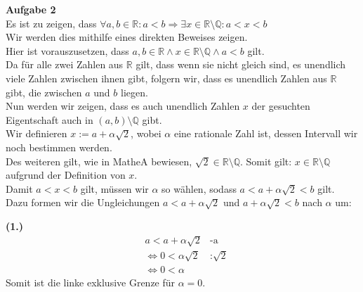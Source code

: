 \documentclass[12pt, a4paper]{article}
\begin{document}
\textbf{Aufgabe 2} \\
Es ist zu zeigen, dass $\forall a,b \in \mathbb R: a < b \Rightarrow \exists x \in \mathbb R \setminus \mathbb Q : a < x < b$\\
Wir werden dies mithilfe eines direkten Beweises zeigen. \\
Hier ist vorauszusetzen, dass $a,b \in \mathbb R \wedge x \in \mathbb R \setminus \mathbb Q \wedge a < b$ gilt. \\
Da für alle zwei Zahlen aus $\mathbb R$ gilt, dass wenn sie nicht gleich sind, es unendlich viele Zahlen zwischen ihnen gibt, folgern wir, dass es unendlich Zahlen aus $\mathbb R$ gibt, die zwischen $a$ und $b$ liegen. \\
Nun werden wir zeigen, dass es auch unendlich Zahlen $x$ der gesuchten Eigentschaft auch in $(a,b) \setminus \mathbb Q$ gibt. \\
Wir definieren $x := a + \alpha \sqrt{2}$, wobei $\alpha$ eine rationale Zahl ist, dessen Intervall wir noch bestimmen werden.\\
Des weiteren gilt, wie in MatheA bewiesen, $\sqrt{2} \in \mathbb R \setminus \mathbb Q$. Somit gilt: $x \in \mathbb R \setminus \mathbb Q$ aufgrund der Definition von $x$. \\
Damit $a < x < b$ gilt, müssen wir $\alpha$ so wählen, sodass $a < a + \alpha \sqrt{2} < b$ gilt. \\
Dazu formen wir die Ungleichungen $a < a + \alpha \sqrt{2}$ und $a + \alpha \sqrt{2} < b$ nach $\alpha$ um:

\textbf{(1.)}
\vspace{-1cm}
\begin{align*}
	& a < a + \alpha \sqrt{2} & \text{-a}\\
	& \Longleftrightarrow 0 < \alpha \sqrt{2} & \text{:$\sqrt{2}$}\\
	& \Longleftrightarrow 0 < \alpha
\end{align*}
\hspace{-0.15cm}
Somit ist die linke exklusive Grenze für $\alpha = 0$.\\
\\\\\\
\end{document}
